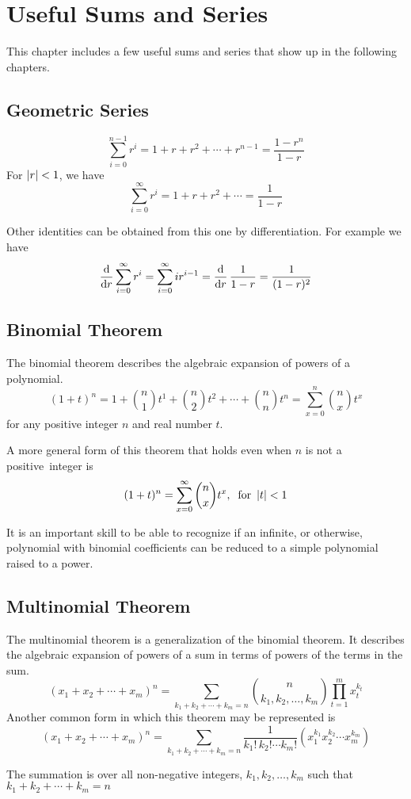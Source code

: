 \chapter{Useful Sums and Series}
This chapter includes a few useful sums and series that show up in the following chapters.
\section{Geometric Series}
\[
    \sum_{i = 0}^{n-1} r^i = 1 + r + r^2 + \cdots + r^{n-1} = \frac{1-r^n}{1-r}
\]
For $\left|r\right| < 1$, we have
\[
    \sum_{i = 0}^{\infty} r^i = 1 + r + r^2 + \cdots = \frac{1}{1-r}
\]
\begin{info}
Other identities can be obtained from this one by differentiation. For example we have
\[
    \frac{\operatorname{d}\!{}}{\operatorname{d}\!{r}}\sum_{i = 0}^{\infty} r^i = \sum_{i = 0}^{\infty} ir^{i-1} = \frac{\operatorname{d}\!{}}{\operatorname{d}\!{r}}\,\frac{1}{1-r} = \frac{1}{(1-r)^2}
\]
\end{info}
\section{Binomial Theorem}
The binomial theorem describes the algebraic expansion of powers of a polynomial.
\[
    (1 + t)^n = 1 + \binom{n}{1}t^1 + \binom{n}{2}t^2 + \cdots + \binom{n}{n}t^n = \sum_{x = 0}^{n} \binom{n}{x} t^x
\]
for any positive integer $n$ and real number $t$.
\par\smallskip
A more general form of this theorem that holds even when $n$ is not a positive~integer is
\[
    (1 + t)^n = \sum_{x = 0}^{\infty} \binom{n}{x} t^x,\:\text{ for } \left|t\right| < 1
\]
\begin{info}
It is an important skill to be able to recognize if an infinite, or otherwise, polynomial with binomial coefficients can be reduced to a simple polynomial raised to a power.
\end{info}
\section{Multinomial Theorem}
The multinomial theorem is a generalization of the binomial theorem. It describes the algebraic expansion of powers of a sum in terms of powers of the terms in the sum.
\[
    (x_1 + x_2 + \cdots + x_m)^n = \sum_{k_1 + k_2 + \cdots + k_m = n} \binom{n}{k_1,k_2,\ldots,k_m} \prod_{t = 1}^{m} x_t^{k_t}
\]
Another common form in which this theorem may be represented is
\[
    (x_1 + x_2 + \cdots + x_m)^n 
    = \sum_{k_1 + k_2 + \cdots + k_m = n} \frac{1}{k_1!\,k_2!\cdots k_m!}(x_1^{k_1}x_2^{k_2}\cdots x_m^{k_m})
\]
\begin{info}
The summation is over all non-negative integers, $k_1,k_2,\ldots,k_m$ such that $k_1 + k_2 + \cdots + k_m = n$
\end{info}

